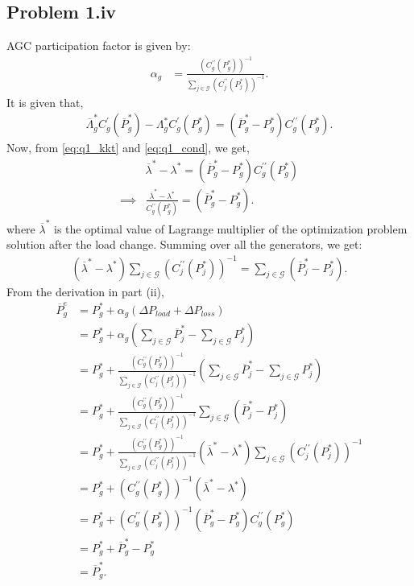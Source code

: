 \subsection*{Problem 1.iv}
AGC participation factor is given by:
\begin{align*}
	\alpha_g &= \frac{(C^{\prime\prime}_g(P_g^*))^{-1}}{\sum_{j \in \mathcal{G}}(C^{\prime\prime}_j(P_j^*))^{-1}}.
\end{align*} 
It is given that,
\begin{align}\label{eq:q1_cond}
	\overline{\Lambda}_g^*C^{\prime}_g(\overline{P}_g^*)-\Lambda_g^*C^{\prime}_g(P_g^*) = (\overline{P}_g^*-P_g^*)C^{\prime\prime}_g(P_g^*).
\end{align}
Now, from \ref{eq:q1_kkt} and \ref{eq:q1_cond}, we get,
\begin{align*}
	&\overline{\lambda}^* - \lambda^* = (\overline{P}_g^*-P_g^*)C^{\prime\prime}_g(P_g^*)\\
	\implies & \frac{\overline{\lambda}^* - \lambda^*}{C^{\prime\prime}_g(P_g^*)} = (\overline{P}_g^*-P_g^*).
\end{align*}
where $\overline{\lambda}^*$ is the optimal value of Lagrange multiplier of the optimization problem solution after the load change. Summing over all the generators, we get:
\begin{align*}
	(\overline{\lambda}^*-\lambda^*)\sum_{j \in \mathcal{G}}(C^{\prime \prime}_j(P_j^*))^{-1} = \sum_{j \in \mathcal{G}}(\overline{P}_j^*-P_j^*).
\end{align*}
From the derivation in part (ii),
\begin{align*}
	\overline{P}_g^e &= P_{g}^*+\alpha_g \left(\Delta P_{load} + \Delta P_{loss}\right)\\
	&= P_g^* + \alpha_g\left(\sum_{j \in \mathcal{G}}\overline{P}_j^* - \sum_{j \in \mathcal{G}}P_j^*\right)\\
	&= P_g^* + \frac{(C^{\prime\prime}_g(P_g^*))^{-1}}{\sum_{j \in \mathcal{G}}(C^{\prime\prime}_j(P_j^*))^{-1}}\left(\sum_{j \in \mathcal{G}}\overline{P}_j^* - \sum_{j \in \mathcal{G}}P_j^*\right)\\
	&= P_g^* + \frac{(C^{\prime\prime}_g(P_g^*))^{-1}}{\sum_{j \in \mathcal{G}}(C^{\prime\prime}_j(P_j^*))^{-1}} \sum_{j \in \mathcal{G}}(\overline{P}_j^*-P_j^*)\\
	&= P_g^* + \frac{(C^{\prime\prime}_g(P_g^*))^{-1}}{\sum_{j \in \mathcal{G}}(C^{\prime\prime}_j(P_j^*))^{-1}} (\overline{\lambda}^*-\lambda^*)\sum_{j \in \mathcal{G}}(C^{\prime \prime}_j(P_j^*))^{-1}\\
	&= P_g^* + (C^{\prime\prime}_g(P_g^*))^{-1} (\overline{\lambda}^*-\lambda^*)\\
	&= P_g^* + (C^{\prime\prime}_g(P_g^*))^{-1}(\overline{P}_g^*-P_g^*)C^{\prime\prime}_g(P_g^*)\\
	&= P_g^* + \overline{P}_g^*-P_g^*\\
	&= \overline{P}_g^*.
\end{align*}
